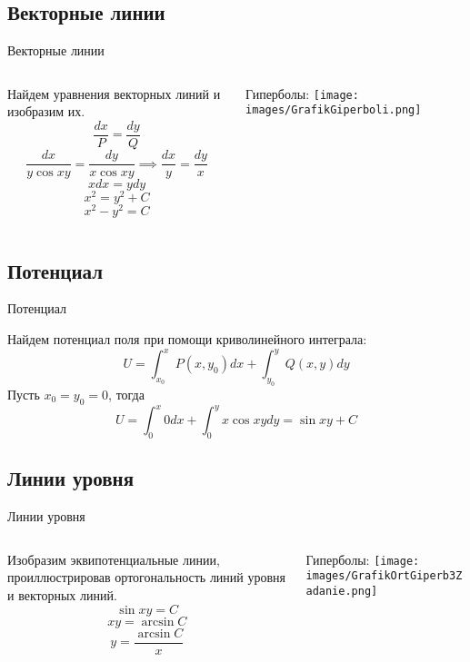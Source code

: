 
\subsection{Векторные линии}
\begin{frame}{Векторные линии}
\begin{columns}
\begin{column}{0.4\paperwidth}
\centering
Найдем уравнения векторных линий и изобразим их. \\
$$
     \frac{dx}{P} = \frac{dy}{Q} 
$$
$$
   \frac{dx}{y\cos{xy}} = \frac{dy}{x\cos{xy}} \implies \frac{dx}{y} = \frac{dy}{x}
$$
$$
xdx = ydy 
$$
$$
x^{2} = y^{2} + C 
$$
$$
x^{2} - y^{2} = C
$$
\end{column}
\begin{column}{0.4\paperwidth}
\centering
Гиперболы: 
\vspace{5mm}
\texttt{[image: images/GrafikGiperboli.png]}
\end{column}
\end{columns}
\end{frame}


\subsection{Потенциал}
\begin{frame}{Потенциал} 
\begin{block}
\centering
Найдем потенциал поля при помощи криволинейного интеграла:
$$
U = \int_{x_0} ^x P(x, y_0)dx + \int_{y_0} ^y Q(x, y)dy
$$
\centering
Пусть $x_0 = y_0 = 0$, тогда 
$$
U = \int_0^x 0dx + \int_0^y x\cos{xy}dy = \sin{xy} + C
$$
\end{block}
\end{frame}


\subsection{Линии уровня}
\begin{frame}{Линии уровня}
\begin{columns}
\begin{column}{0.4\paperwidth}
\centering
Изобразим эквипотенциальные линии, проиллюстрировав ортогональность линий уровня и векторных линий.  
$$
\sin{xy} = C
$$
$$
xy = \arcsin{C}
$$
$$
y = \frac{\arcsin{C}}{x}
$$
\end{column}
\begin{column}{0.4\paperwidth}
\centering
Гиперболы:
\vspace{5mm}
\texttt{[image: images/GrafikOrtGiperb3Zadanie.png]}
\end{column}
\end{columns}
\end{frame}

